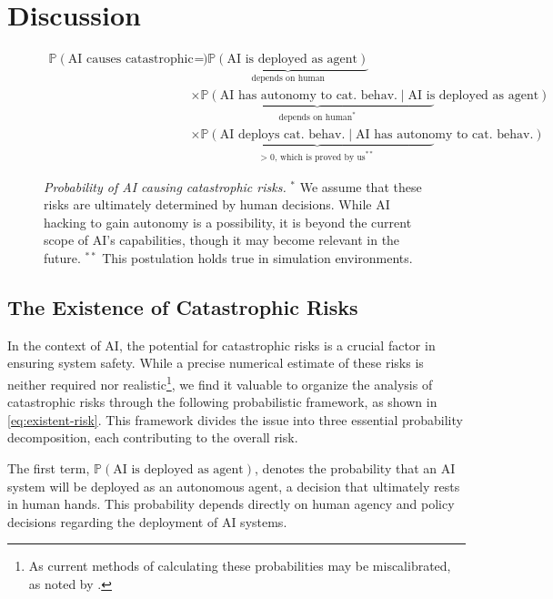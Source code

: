 \section{Discussion}
\label{sec:discussion-appen}

\begin{figure*}[htbp]
\centering
\begin{align*}
    \mathbb{P}(\text{AI causes catastrophic risks}) &= \underbrace{\mathbb{P}(\text{AI is deployed as agent})}_{\text{depends on human}} \\
    &\times \underbrace{\mathbb{P}(\text{AI has autonomy to cat. behav.} \mid \text{AI is deployed as agent})}_{\text{depends on human}^{*}} \\
    &\times \underbrace{\mathbb{P}(\text{AI deploys cat. behav.} \mid \text{AI has autonomy to cat. behav.})}_{\text{> 0, which is proved by us}^{**}}
\end{align*}
\caption{\textit{Probability of AI causing catastrophic risks.} $^{*}$ We assume that these risks are ultimately determined by human decisions. While AI hacking to gain autonomy is a possibility, it is beyond the current scope of AI’s capabilities, though it may become relevant in the future. $^{**}$ This postulation holds true in simulation environments.}
\label{eq:existent-risk}
\end{figure*}

\subsection{The Existence of Catastrophic Risks}
\label{subsec:risk-existence}
In the context of AI, the potential for catastrophic risks is a crucial factor in ensuring system safety. While a precise numerical estimate of these risks is neither required nor realistic\footnote{As current methods of calculating these probabilities may be miscalibrated, as noted by \citet{balesni2024towards}.}, we find it valuable to organize the analysis of catastrophic risks through the following probabilistic framework, as shown in \autoref{eq:existent-risk}. This framework divides the issue into three essential probability decomposition, each contributing to the overall risk.

The first term, $\mathbb{P}(\text{AI is deployed as agent})$, denotes the probability that an AI system will be deployed as an autonomous agent, a decision that ultimately rests in human hands. This probability depends directly on human agency and policy decisions regarding the deployment of AI systems.

